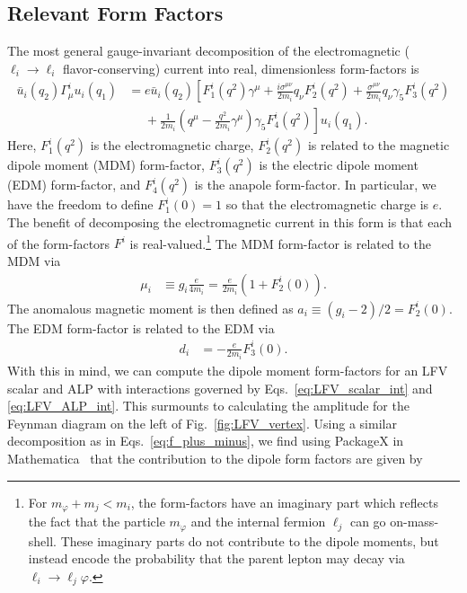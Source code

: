 {\subsection{Relevant Form Factors}\label{sec:diagonal_ff}
The most general gauge-invariant decomposition of the electromagnetic ($\ell_i \rightarrow\ell_i$ flavor-conserving) current into real, dimensionless form-factors is \cite{Nowakowski:2004cv}
\begin{align}
    \bar{u}_i(q_2)\Gamma_\mu^{i} u_i(q_1) &= e\bar{u}_i(q_2)\left[F_1^{i}(q^2)\gamma^\mu +  \frac{i\sigma^{\mu\nu}}{2m_i}q_\nu F_2^i(q^2) + \frac{\sigma^{\mu\nu}}{2m_i}q_\nu \gamma_5 F_3^i(q^2)\right.\nonumber\\ 
    &\left.\ \ \ \ \ \ + \frac{1}{2m_i}\left(q^\mu - \frac{q^2}{2m_i}\gamma^\mu\right)\gamma_5 F_4^i(q^2)\right]u_i(q_1).
\end{align}
Here, $F_1^i(q^2)$ is the electromagnetic charge, $F_2^i(q^2)$ is related to the magnetic dipole moment (MDM) form-factor, $F_3^i(q^2)$ is the electric dipole moment (EDM) form-factor, and $F_4^i(q^2)$ is the anapole form-factor. In particular, we have the freedom to define $F_1^i(0) = 1$ so that the electromagnetic charge is $e$. The benefit of decomposing the electromagnetic current in this form is that each of the form-factors $F^i$ is real-valued.\footnote{For $m_\varphi + m_j < m_i$, the form-factors have an imaginary part which reflects the fact that the particle $m_\varphi$ and the internal fermion $\ell_j$ can go on-mass-shell. These imaginary parts do not contribute to the dipole moments, but instead encode the probability that the parent lepton may decay via $\ell_i \rightarrow \ell_j \varphi$.} The MDM form-factor is related to the MDM via
\begin{align}
    \mu_i &\equiv g_i\frac{e}{4m_i} = \frac{e}{2m_i}\left(1 + F_2^i(0)\right).
\end{align}
The anomalous magnetic moment is then defined as $a_i \equiv (g_i - 2)/2 = F_2^i(0)$. The EDM form-factor is related to the EDM via
\begin{align}
    d_i & = -\frac{e}{2m_i}F_3^i(0).
\end{align}
With this in mind, we can compute the dipole moment form-factors for an LFV scalar and ALP with interactions governed by Eqs.~\ref{eq:LFV_scalar_int} and \ref{eq:LFV_ALP_int}. This surmounts to calculating the amplitude for the Feynman diagram on the left of Fig.~\ref{fig:LFV_vertex}. Using a similar decomposition as in Eqs.~\ref{eq:f_plus_minus}, we find using PackageX in Mathematica~\cite{Patel:2016fam} that the contribution to the dipole form factors are given by
}
